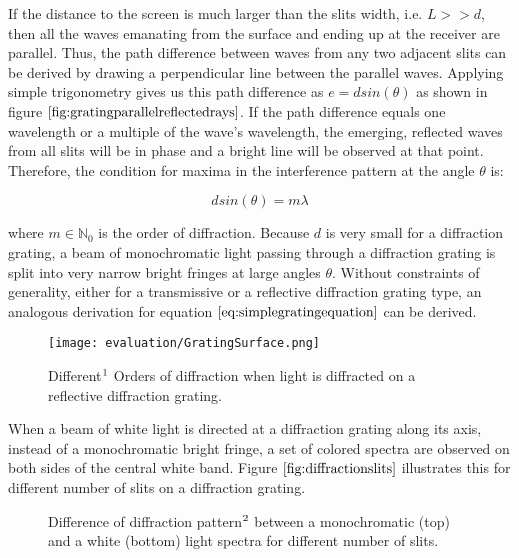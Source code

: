 If the distance to the screen is much larger than the slits width, i.e. $L >> d$, then all the waves emanating from the surface and ending up at the receiver are parallel. Thus, the path difference between waves from any two adjacent slits can be derived by drawing a perpendicular line between the parallel waves. Applying simple trigonometry gives us this path difference as $e = d sin(\theta)$ as shown in figure $\ref{fig:gratingparallelreflectedrays}$. If the path difference equals one wavelength or a multiple of the wave's wavelength, the emerging, reflected waves from all slits will be in phase and a bright line will be observed at that point. Therefore, the condition for maxima in the interference pattern at the angle $\theta$ is: 

\begin{equation}
 d sin(\theta) = m \lambda 
\label{eq:simplegratingequation}
\end{equation}

where $m \in \mathds{N}_0$ is the order of diffraction. Because $d$ is very small for a diffraction grating, a beam of monochromatic light passing through a diffraction grating is split into very narrow bright fringes at large angles $\theta$. Without constraints of generality, either for a transmissive or a reflective diffraction grating type, an analogous derivation for equation $\ref{eq:simplegratingequation}$ can be derived.

\begin{figure}[H]
  \centering
  \texttt{[image: evaluation/GratingSurface.png]}
  \caption[Diffraction Orders]{Different$\footnotemark$ Orders of diffraction when light is diffracted on a reflective diffraction grating.}
\label{fig:gratingdiffractionorders}
\end{figure}

When a beam of white light is directed at a diffraction grating along its axis, instead of a monochromatic bright fringe, a set of colored spectra are observed on both sides of the central white band. Figure $\ref{fig:diffractionslits}$ illustrates this for different number of slits on a diffraction grating. 

\begin{figure}[H]
  \centering
  
\caption[N Slit Diffraction Grating Pattern]{Difference of diffraction pattern$\footnotemark$ between a monochromatic (top) and a white (bottom) light spectra for different number of slits.}
\label{fig:diffractionslits}
\end{figure}

